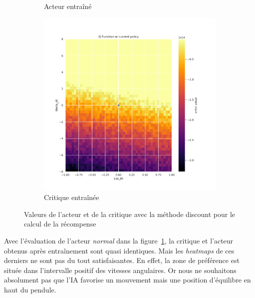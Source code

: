 \begin{figure}[H]
\begin{subfigure}{0.3\textwidth}
        \caption{Acteur entraîné}
    \end{subfigure}
    \begin{subfigure}{0.3\textwidth}
        \includegraphics[width=\textwidth]{figures/iteration1/0_critic_discount_post_Pendulum-v0.pdf}
        \caption{Critique entraînée}
    \end{subfigure}
    \caption{Valeurs de l'acteur et de la critique avec la méthode discount pour le calcul de la récompense}
    \label{fig:attempt1_disount}
\end{figure}

Avec l'évaluation de l'acteur \emph{normal} dans la figure~\ref{fig:attempt1_disount}, la critique et l'acteur obtenus après entraînement sont quasi identiques. Mais les \emph{heatmaps} de ces derniers ne sont pas du tout satisfaisantes. En effet, la zone de préférence est située dans l'intervalle positif des vitesses angulaires. Or nous ne souhaitons absolument pas que l'IA favorise un mouvement mais une position d'équilibre en haut du pendule.

